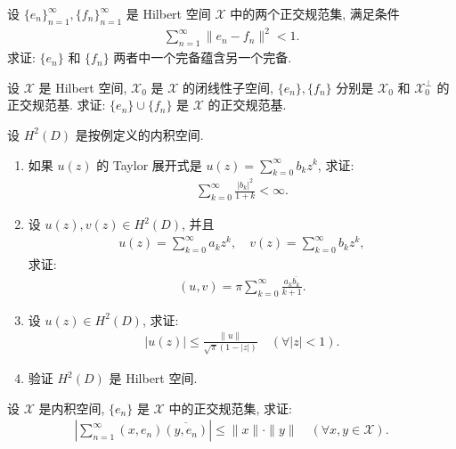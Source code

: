 \documentclass[../../main.tex]{subfiles}%
\begin{document}
\begin{example}
设 $\{e_n\}_{n=1}^\infty,\{f_n\}_{n=1}^\infty$ 是 Hilbert 空间 $\mathscr{X}$ 中的两个正交规范集, 满足条件
\begin{align*}
\sum\limits_{n=1}^\infty\|e_n-f_n\|^2<1.
\end{align*}
求证: $\{e_n\}$ 和 $\{f_n\}$ 两者中一个完备蕴含另一个完备.
\end{example}

\begin{example}
设 $\mathscr{X}$ 是 Hilbert 空间, $\mathscr{X}_0$ 是 $\mathscr{X}$ 的闭线性子空间, $\{e_n\},\{f_n\}$ 分别是 $\mathscr{X}_0$ 和 $\mathscr{X}_0^\perp$ 的正交规范基. 求证: $\{e_n\}\cup\{f_n\}$ 是 $\mathscr{X}$ 的正交规范基.
\end{example}

\begin{example}
设 $H^2(D)$ 是按例定义的内积空间.
\begin{enumerate}[(1)]
\item 如果 $u(z)$ 的 Taylor 展开式是 $u(z)=\sum\limits_{k=0}^\infty b_k z^k$, 求证:
\begin{align*}
\sum\limits_{k=0}^\infty\frac{|b_k|^2}{1+k}<\infty.
\end{align*}
\item 设 $u(z),v(z)\in H^2(D)$, 并且
\begin{align*}
u(z)=\sum\limits_{k=0}^\infty a_k z^k,\quad v(z)=\sum\limits_{k=0}^\infty b_k z^k,
\end{align*}
求证:
\begin{align*}
(u,v)=\pi\sum\limits_{k=0}^\infty\frac{a_k\overline{b_k}}{k+1}.
\end{align*}
\item 设 $u(z)\in H^2(D)$, 求证:
\begin{align*}
|u(z)|\leqslant\frac{\|u\|}{\sqrt{\pi}(1-|z|)}\quad(\forall|z|<1).
\end{align*}
\item 验证 $H^2(D)$ 是 Hilbert 空间.
\end{enumerate}
\end{example}

\begin{example}
设 $\mathscr{X}$ 是内积空间, $\{e_n\}$ 是 $\mathscr{X}$ 中的正交规范集, 求证:
\begin{align*}
\left|\sum\limits_{n=1}^\infty(x,e_n)\overline{(y,e_n)}\right|\leqslant\|x\|\cdot\|y\|\quad(\forall x,y\in\mathscr{X}).
\end{align*}
\end{example}
\end{document}
